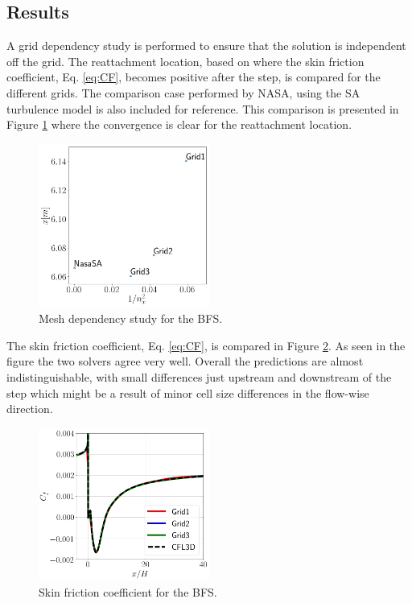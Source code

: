 \subsection{Results}
A grid dependency study is performed to ensure that the solution is independent off the grid. The reattachment location, based on where the skin friction coefficient, Eq. \ref{eq:CF}, becomes positive after the step, is compared for the different grids. The comparison case performed by NASA, using the SA turbulence model \cite{NASA} is also included for reference. This comparison is presented in Figure \ref{fig:BFSconstudy} where the convergence is clear for the reattachment location.
\begin{figure}[H]
  \centering
  \includegraphics[width=0.5\textwidth]{figures/BFSAttachment.png}
  \caption{Mesh dependency study for the BFS.} \label{fig:BFSconstudy}
\end{figure}
The skin friction coefficient, Eq. \ref{eq:CF}, is compared in Figure \ref{fig:BFSCF}. As seen in the figure the two solvers agree very well. Overall the predictions are almost indistinguishable, with small differences just upstream and downstream of the step which might be a result of minor cell size differences in the flow-wise direction.
\begin{figure}[H]
  \centering
  \includegraphics[width=0.5\textwidth]{figures/BFSCf.png}
  \caption{Skin friction coefficient for the BFS.} \label{fig:BFSCF}
\end{figure}
